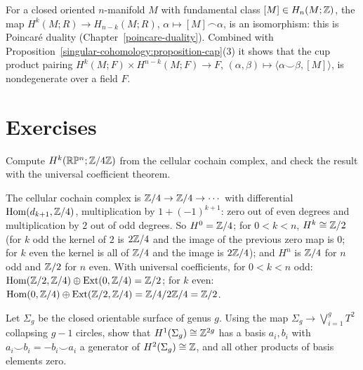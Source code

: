\begin{remark}\label{singular-cohomology:remark-duality-preview}
For a closed oriented $n$-manifold $M$ with fundamental class $[M] \in H_n(M; \mathbb{Z})$, the map $H^k(M; R) \to H_{n-k}(M; R)$, $\alpha \mapsto [M] \frown \alpha$, is an
isomorphism: this is Poincar\'e duality (Chapter~\ref{poincare-duality}). Combined with Proposition~\ref{singular-cohomology:proposition-cap}(3) it shows that the
cup product pairing $H^k(M; F) \times H^{n-k}(M; F) \to F$, $(\alpha, \beta) \mapsto \langle \alpha \smile \beta, [M]\rangle$, is nondegenerate over a field $F$.
\end{remark}

\section{Exercises}\label{singular-cohomology:section-exercises}

\begin{exercise}\label{singular-cohomology:exercise-uct-rp}
Compute $H^k(\mathbb{R}\mathbb{P}^n; \mathbb{Z}/4\mathbb{Z})$ from the cellular cochain complex, and check the result with the universal coefficient theorem.
\end{exercise}

\begin{solution}
The cellular cochain complex is $\mathbb{Z}/4 \to \mathbb{Z}/4 \to \cdots$ with differential $\operatorname{Hom}(d_{k+1}, \mathbb{Z}/4)$, multiplication by $1 + (-1)^{k+1}$: zero out of even degrees and
multiplication by $2$ out of odd degrees. So $H^0 = \mathbb{Z}/4$; for $0 < k < n$, $H^k \cong \mathbb{Z}/2$ (for $k$ odd the kernel of $2$ is $2\mathbb{Z}/4$ and the image of the previous zero map is
$0$; for $k$ even the kernel is all of $\mathbb{Z}/4$ and the image is $2\mathbb{Z}/4$); and $H^n$ is $\mathbb{Z}/4$ for $n$ odd and $\mathbb{Z}/2$ for $n$ even. With universal coefficients, for
$0 < k < n$ odd: $\operatorname{Hom}(\mathbb{Z}/2, \mathbb{Z}/4) \oplus \operatorname{Ext}(0, \mathbb{Z}/4) = \mathbb{Z}/2$; for $k$ even: $\operatorname{Hom}(0, \mathbb{Z}/4) \oplus \operatorname{Ext}(\mathbb{Z}/2, \mathbb{Z}/4) = \mathbb{Z}/4/2\mathbb{Z}/4 = \mathbb{Z}/2$.
\end{solution}

\begin{exercise}\label{singular-cohomology:exercise-cup-torus}
Let $\Sigma_g$ be the closed orientable surface of genus $g$. Using the map $\Sigma_g \to \bigvee_{i=1}^g T^2$ collapsing $g - 1$ circles, show that $H^1(\Sigma_g) \cong \mathbb{Z}^{2g}$
has a basis $a_i, b_i$ with $a_i \smile b_i = -b_i \smile a_i$ a generator of $H^2(\Sigma_g) \cong \mathbb{Z}$, and all other products of basis elements zero.
\end{exercise}

